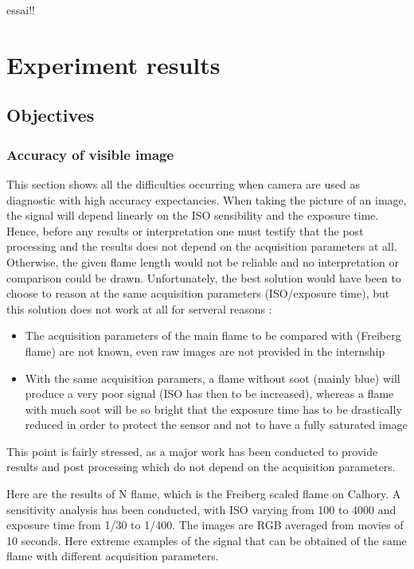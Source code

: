 \renewcommand\evenpagerightmark{{\scshape\small Experiment results}}
essai!!
\chapter[Experiment results]%
{Experiment results}
\label{experiment_chapt}

\section{Objectives}


\subsection{Accuracy of visible image }

This section shows all the difficulties occurring when camera are used as diagnostic with high accuracy expectancies.  When taking the picture of an image, the signal will depend linearly on the ISO sensibility and the exposure time. Hence, before any results or interpretation one must testify that the post processing and the results does not depend on the acquisition parameters at all. Otherwise, the given flame length would not be reliable and no interpretation or comparison could be drawn. Unfortunately, the best solution would have been to choose to reason at the same acquisition parameters (ISO/exposure time), but this solution does not work at all for serveral reasons :
\begin{itemize}
\item The acquisition parameters of the main flame to be compared with (Freiberg flame) are not known, even raw images are not provided in the internship
\item With the same acquisition paramers, a flame without soot (mainly blue) will produce a very poor signal (ISO has then to be increased), whereas a flame with much soot will be so bright that the exposure time has to be drastically reduced in order to protect the sensor and not to have a fully saturated image
\end{itemize}

This point is fairly stressed, as a major work has been conducted to provide results and post processing which do not depend on the acquisition parameters.

Here are the results of N flame, which is the Freiberg scaled flame on Calhory. A sensitivity analysis has been conducted, with ISO varying from 100 to 4000 and exposure time from 1/30 to 1/400. The images are RGB averaged from movies of 10 seconds. Here extreme examples of the signal that can be obtained of the same flame with different acquisition parameters.

